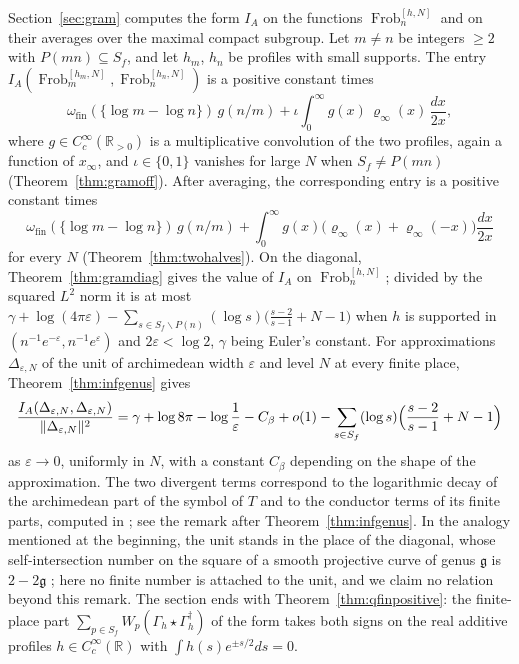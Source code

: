 \documentclass[11pt]{amsart}
\theoremstyle{definition}
\newcommand{\R}{\mathbb R}
\newcommand{\Frob}{\operatorname{Frob}}
\begin{document}
Section~\ref{sec:gram} computes the form $I_A$ on the functions
$\Frob_n^{[h,N]}$ and on their averages over the maximal compact subgroup.
Let $m\ne n$ be integers $\ge2$ with $P(mn)\subseteq S_f$, and let $h_m$,
$h_n$ be profiles with small supports. The entry
$I_A(\Frob_m^{[h_m,N]},\Frob_n^{[h_n,N]})$ is a positive constant times
\[
  \omega_{\mathrm{fin}}(\{\log m-\log n\})\,g(n/m)
   +\iota\int_0^\infty g(x)\,\varrho_\infty(x)\,\frac{dx}{2x},
\]
where $g\in C_c^\infty(\R_{>0})$ is a multiplicative convolution of
the two profiles, again a function of $x_\infty$, and $\iota\in\{0,1\}$
vanishes for large $N$ when $S_f\ne P(mn)$ (Theorem~\ref{thm:gramoff}).
After averaging, the corresponding entry is a positive constant times
\[
  \omega_{\mathrm{fin}}(\{\log m-\log n\})\,g(n/m)
   +\int_0^\infty g(x)\bigl(\varrho_\infty(x)+\varrho_\infty(-x)\bigr)
     \frac{dx}{2x}
\]
for every $N$ (Theorem~\ref{thm:twohalves}). On the diagonal,
Theorem~\ref{thm:gramdiag} gives the value of $I_A$ on $\Frob_n^{[h,N]}$;
divided by the squared $L^2$ norm it is at most
$\gamma+\log(4\pi\varepsilon)-\sum_{s\in S_f\smallsetminus P(n)}(\log s)
\bigl(\tfrac{s-2}{s-1}+N-1\bigr)$ when $h$ is supported in
$(n^{-1}e^{-\varepsilon},n^{-1}e^{\varepsilon})$ and $2\varepsilon<\log2$,
$\gamma$ being Euler's constant. For approximations $\Delta_{\varepsilon,N}$
of the unit of archimedean width $\varepsilon$ and level $N$ at every finite
place, Theorem~\ref{thm:infgenus} gives
\[
  \frac{I_A(\Delta_{\varepsilon,N},\Delta_{\varepsilon,N})}
       {\|\Delta_{\varepsilon,N}\|^2}
   =\gamma+\log8\pi-\log\frac1\varepsilon-C_\beta+o(1)
    -\sum_{s\in S_f}(\log s)\Bigl(\frac{s-2}{s-1}+N-1\Bigr)
\]
as $\varepsilon\to0$, uniformly in $N$, with a constant $C_\beta$ depending
on the shape of the approximation. The two divergent terms correspond to the
logarithmic decay of the archimedean part of the symbol of $T$ and to the
conductor terms of its finite parts, computed in
\cite[Theorem~5.12]{Companion}; see the remark after
Theorem~\ref{thm:infgenus}. In the analogy
mentioned at the beginning, the unit stands in the place of the diagonal,
whose self-intersection number on the square of a smooth projective curve of
genus $\mathfrak g$ is $2-2\mathfrak g$
\cite[Ch.~V, Exercise~1.6(a)]{Hartshorne}; here no finite number is attached
to the unit, and we claim no relation beyond this remark. The section ends
with Theorem~\ref{thm:qfinpositive}: the finite-place part
$\sum_{p\in S_f}W_p(\Gamma_h\star\Gamma_h^\dagger)$ of the form takes both
signs on the real additive profiles $h\in C_c^\infty(\R)$ with
$\int h(s)e^{\pm s/2}ds=0$.
\end{document}
